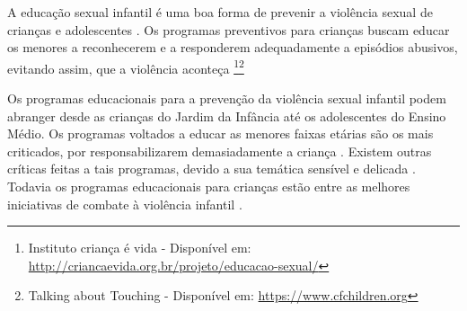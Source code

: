 A educação sexual infantil é uma boa forma de prevenir a violência sexual de crianças e adolescentes \cite{finkelhor2009prevention}. Os programas preventivos para crianças buscam educar os menores a reconhecerem e a responderem adequadamente a episódios abusivos, evitando assim, que a violência aconteça \footnote{Instituto criança é vida - Disponível em: \url{http://criancaevida.org.br/projeto/educacao-sexual/}}\footnote{Talking about Touching - Disponível em: \url{https://www.cfchildren.org}}%

\vspace{-0.15cm}



Os programas educacionais para a prevenção da violência sexual infantil podem abranger desde as crianças do Jardim da Infância até os adolescentes do Ensino Médio. Os programas voltados a educar as menores faixas etárias são os mais criticados, por responsabilizarem demasiadamente a criança \cite{dip2016advancing}. %
Existem outras críticas feitas a tais programas, devido a sua temática sensível e delicada \cite{scholes2014serious}. Todavia os programas educacionais para crianças estão entre as melhores iniciativas de combate à violência infantil \cite{barron2008school}.%
\vspace{-0.15cm}

